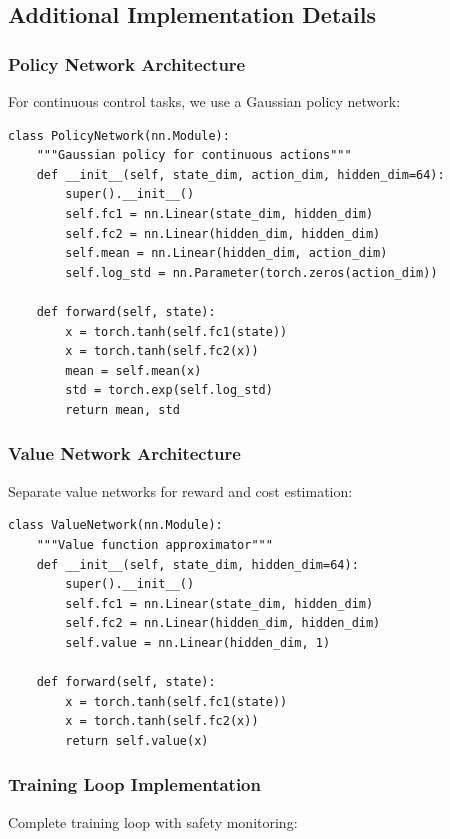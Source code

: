 \documentclass[12pt]{article}
\begin{document}
{{{{\subsection{Additional Implementation Details}

\subsubsection{Policy Network Architecture}

For continuous control tasks, we use a Gaussian policy network:

\begin{verbatim}
class PolicyNetwork(nn.Module):
    """Gaussian policy for continuous actions"""
    def __init__(self, state_dim, action_dim, hidden_dim=64):
        super().__init__()
        self.fc1 = nn.Linear(state_dim, hidden_dim)
        self.fc2 = nn.Linear(hidden_dim, hidden_dim)
        self.mean = nn.Linear(hidden_dim, action_dim)
        self.log_std = nn.Parameter(torch.zeros(action_dim))

    def forward(self, state):
        x = torch.tanh(self.fc1(state))
        x = torch.tanh(self.fc2(x))
        mean = self.mean(x)
        std = torch.exp(self.log_std)
        return mean, std
\end{verbatim}

\subsubsection{Value Network Architecture}

Separate value networks for reward and cost estimation:

\begin{verbatim}
class ValueNetwork(nn.Module):
    """Value function approximator"""
    def __init__(self, state_dim, hidden_dim=64):
        super().__init__()
        self.fc1 = nn.Linear(state_dim, hidden_dim)
        self.fc2 = nn.Linear(hidden_dim, hidden_dim)
        self.value = nn.Linear(hidden_dim, 1)

    def forward(self, state):
        x = torch.tanh(self.fc1(state))
        x = torch.tanh(self.fc2(x))
        return self.value(x)
\end{verbatim}

\subsubsection{Training Loop Implementation}

Complete training loop with safety monitoring:

}}}}
\end{document}
